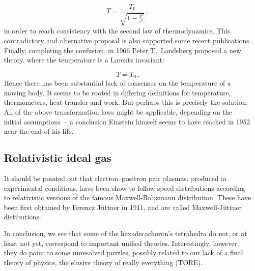 \begin{equation*}\label{reltemphigher}
  T = \frac{T_0}{\sqrt{1-\frac{v^2}{c^2}}}\,,
\end{equation*}
%
in order to reach consistency with the second law of thermodynamics. This contradictory and alternative proposal is also supported some recent publications. Finally, completing the confusion, in 1966 Peter T.\ Landsberg proposed a new theory, where the temperature is a Lorentz invariant:

\begin{equation*}\label{reltempequal}
  T = T_0\,.
\end{equation*}
%
Hence there has been substantial lack of consensus on the temperature of a moving body. It seems to be rooted in differing definitions for temperature, thermometers, heat transfer and work. But perhaps this is precisely the solution: All of the above transformation laws might be applicable, depending on the initial assumptions~-- a conclusion Einstein himself seems to have reached in 1952 near the end of his life.


\subsection*{Relativistic ideal gas}

It should be pointed out that electron–positron pair plasmas, produced in experimental conditions, have been show to follow speed distributions according to relativistic versions of the famous Maxwell-Boltzmann distribution. These have been first obtained by Ferencz Jüttner in 1911, and are called Maxwell-Jüttner distibutions.

In conclusion, we see that some of the hexadecachoron's tetrahedra do not, or at least not yet, correspond to important unified theories. Interestingly, however, they do point to some unresolved puzzles, possibly related to our lack of a final theory of physics, the elusive theory of really everything (TORE).


